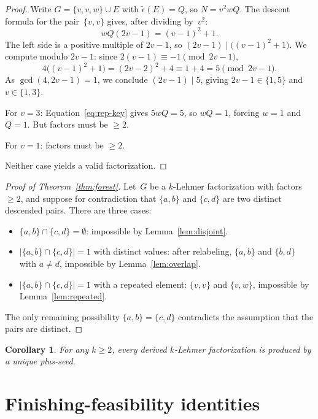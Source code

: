 \documentclass[11pt]{article}
\newtheorem{corollary}[theorem]{Corollary}
\theoremstyle{definition}
\theoremstyle{remark}
\newcommand{\eps}{\tilde{\epsilon}}
\begin{document}
\begin{proof}
Write $G = \{v, v, w\} \cup E$ with $\eps(E) = Q$, so $N = v^2 wQ$.  The
descent formula for the pair~$\{v,v\}$ gives, after dividing by~$v^2$:
\begin{equation}\label{eq:rep-key}
  wQ(2v-1) = (v-1)^2 + 1.
\end{equation}
The left side is a positive multiple of $2v - 1$, so
$(2v-1) \mid \bigl((v-1)^2 + 1\bigr)$.  We compute modulo $2v-1$: since
$2(v-1) \equiv -1 \pmod{2v-1}$,
\[
  4\bigl((v-1)^2 + 1\bigr) = (2v-2)^2 + 4 \equiv 1 + 4 = 5 \pmod{2v-1}.
\]
As $\gcd(4, 2v-1) = 1$, we conclude $(2v-1) \mid 5$, giving
$2v - 1 \in \{1, 5\}$ and $v \in \{1, 3\}$.

For $v = 3$: Equation~\eqref{eq:rep-key} gives $5wQ = 5$, so $wQ = 1$,
forcing $w = 1$ and $Q = 1$.  But factors must be $\ge 2$.

For $v = 1$: factors must be $\ge 2$.

Neither case yields a valid factorization.
\end{proof}


\begin{proof}[Proof of Theorem~\ref{thm:forest}]
Let~$G$ be a $k$-Lehmer factorization with factors $\ge 2$, and suppose
for contradiction that $\{a,b\}$ and $\{c,d\}$ are two distinct descended
pairs.  There are three cases:
\begin{itemize}
  \item $\{a,b\} \cap \{c,d\} = \emptyset$: impossible by
    Lemma~\ref{lem:disjoint}.
  \item $|\{a,b\} \cap \{c,d\}| = 1$ with distinct values: after
    relabeling, $\{a,b\}$ and $\{b,d\}$ with $a \ne d$, impossible by
    Lemma~\ref{lem:overlap}.
  \item $|\{a,b\} \cap \{c,d\}| = 1$ with a repeated element: $\{v,v\}$
    and $\{v,w\}$, impossible by Lemma~\ref{lem:repeated}.
\end{itemize}
The only remaining possibility $\{a,b\} = \{c,d\}$ contradicts the
assumption that the pairs are distinct.
\end{proof}

\begin{corollary}\label{cor:unique-seed}
For any $k \ge 2$, every derived $k$-Lehmer factorization is produced
by a unique plus-seed.
\end{corollary}


\section{Finishing-feasibility identities}\label{sec:finishing}
\end{document}
